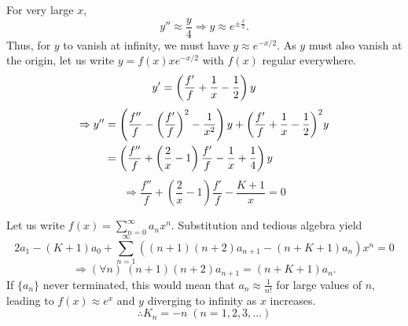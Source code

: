 \item
For very large $x$,
\[
	y'' \approx \frac{y}{4}
	\Rightarrow y \approx e^{\pm \frac{x}{2}}.
\]
Thus, for $y$ to vanish at infinity, we must have $y \approx e^{-x / 2}$.
As $y$ must also vanish at the origin, let us write $y = f(x) x e^{-x / 2}$ with $f(x)$ regular everywhere.
\[
	y' = \left( \frac{f'}{f} + \frac{1}{x} - \frac{1}{2} \right) y
\]
\begin{align*}
	\Rightarrow y''
	&= \left( \frac{f''}{f} - {\left( \frac{f'}{f} \right)}^2 - \frac{1}{x^2} \right) y
	 + {\left( \frac{f'}{f} + \frac{1}{x} - \frac{1}{2} \right)}^2 y \\
	&= \left( \frac{f''}{f} + \left( \frac{2}{x} - 1 \right) \frac{f'}{f} - \frac{1}{x} + \frac{1}{4} \right) y
\end{align*}
\[
	\Rightarrow \frac{f''}{f} + \left( \frac{2}{x} - 1 \right) \frac{f'}{f} - \frac{K + 1}{x} = 0
\]

Let us write $f(x) = \sum_{n=0}^\infty a_n x^n$.
Substitution and tedious algebra yield
\[
	2a_1 - (K + 1) a_0 + \sum_{n=1}^\infty ((n + 1)(n + 2)a_{n + 1} - (n + K + 1) a_n) x^n = 0
\]
\[
	\Rightarrow (\forall n)\; (n + 1)(n + 2)a_{n + 1} = (n + K + 1) a_n.
\]
If $\{a_n\}$ never terminated, this would mean that $a_n \approx \frac{1}{n!}$ for large values of $n$,
leading to $f(x) \approx e^x$ and $y$ diverging to infinity as $x$ increases.
\[
	\therefore K_n = -n\; (n = 1, 2, 3, \dots)
\]